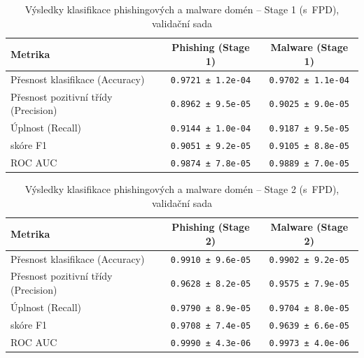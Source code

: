 \begin{table}[H]
\centering
\begin{tabular}{|l|c|c|}
\hline
\textbf{Metrika} & \textbf{Phishing (Stage 1)} & \textbf{Malware (Stage 1)} \\
\hline
Přesnost klasifikace (Accuracy)     & \texttt{0.9721 ± 1.2e-04}  & \texttt{0.9702 ± 1.1e-04} \\
Přesnost pozitivní třídy (Precision)    & \texttt{0.8962 ± 9.5e-05}  & \texttt{0.9025 ± 9.0e-05} \\
Úplnost (Recall)       & \texttt{0.9144 ± 1.0e-04}  & \texttt{0.9187 ± 9.5e-05} \\
skóre F1                & \texttt{0.9051 ± 9.2e-05}  & \texttt{0.9105 ± 8.8e-05} \\
ROC AUC                 & \texttt{0.9874 ± 7.8e-05}  & \texttt{0.9889 ± 7.0e-05} \\
\hline
\end{tabular}
\caption{Výsledky klasifikace phishingových a malware domén – Stage 1 (s~FPD), validační sada}
\label{tab:final_stage1_val_combined}
\end{table}


\begin{table}[H]
\centering
\begin{tabular}{|l|c|c|}
\hline
\textbf{Metrika} & \textbf{Phishing (Stage 2)} & \textbf{Malware (Stage 2)} \\
\hline
Přesnost klasifikace (Accuracy)     & \texttt{0.9910 ± 9.6e-05}  & \texttt{0.9902 ± 9.2e-05} \\
Přesnost pozitivní třídy (Precision)    & \texttt{0.9628 ± 8.2e-05}  & \texttt{0.9575 ± 7.9e-05} \\
Úplnost (Recall)         & \texttt{0.9790 ± 8.9e-05}  & \texttt{0.9704 ± 8.0e-05} \\
skóre F1                & \texttt{0.9708 ± 7.4e-05}  & \texttt{0.9639 ± 6.6e-05} \\
ROC AUC                 & \texttt{0.9990 ± 4.3e-06}  & \texttt{0.9973 ± 4.0e-06} \\
\hline
\end{tabular}
\caption{Výsledky klasifikace phishingových a malware domén – Stage 2 (s~FPD), validační sada}
\label{tab:final_stage2_val_combined}
\end{table}

